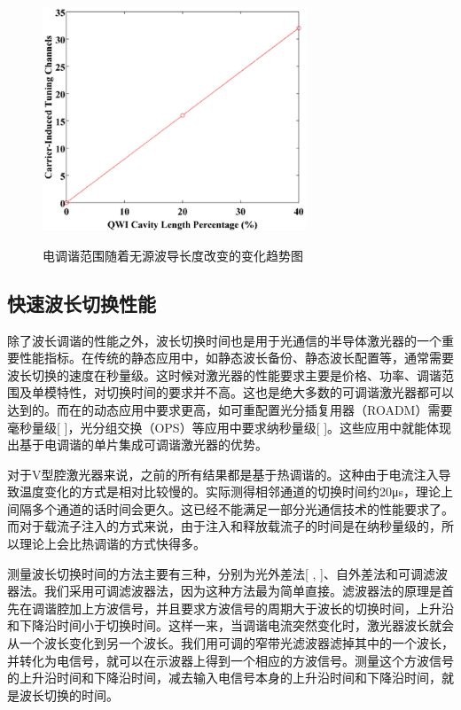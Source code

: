 \documentclass{ZJUthesis}
\begin{document}
\begin{figure}[!ht]
  \centering
  \includegraphics[width=0.7\textwidth]{./Pictures/20p4.eps}\\
  \caption{电调谐范围随着无源波导长度改变的变化趋势图}
  \label{fig_20p4}
\end{figure}

\subsection{快速波长切换性能}

除了波长调谐的性能之外，波长切换时间也是用于光通信的半导体激光器的一个重要性能指标。在传统的静态应用中，如静态波长备份、静态波长配置等，通常需要波长切换的速度在秒量级。这时候对激光器的性能要求主要是价格、功率、调谐范围及单模特性，对切换时间的要求并不高。这也是绝大多数的可调谐激光器都可以达到的。而在的动态应用中要求更高，如可重配置光分插复用器（ROADM）需要毫秒量级[ ]，光分组交换（OPS）等应用中要求纳秒量级[ ]。这些应用中就能体现出基于电调谐的单片集成可调谐激光器的优势。

对于V型腔激光器来说，之前的所有结果都是基于热调谐的。这种由于电流注入导致温度变化的方式是相对比较慢的。实际测得相邻通道的切换时间约20μs，理论上间隔多个通道的话时间会更久。这已经不能满足一部分光通信技术的性能要求了。而对于载流子注入的方式来说，由于注入和释放载流子的时间是在纳秒量级的，所以理论上会比热调谐的方式快得多。

测量波长切换时间的方法主要有三种，分别为光外差法[ , ]、自外差法和可调滤波器法。我们采用可调滤波器法，因为这种方法最为简单直接。滤波器法的原理是首先在调谐腔加上方波信号，并且要求方波信号的周期大于波长的切换时间，上升沿和下降沿时间小于切换时间。这样一来，当调谐电流突然变化时，激光器波长就会从一个波长变化到另一个波长。我们用可调的窄带光滤波器滤掉其中的一个波长，并转化为电信号，就可以在示波器上得到一个相应的方波信号。测量这个方波信号的上升沿时间和下降沿时间，减去输入电信号本身的上升沿时间和下降沿时间，就是波长切换的时间。
\end{document}
